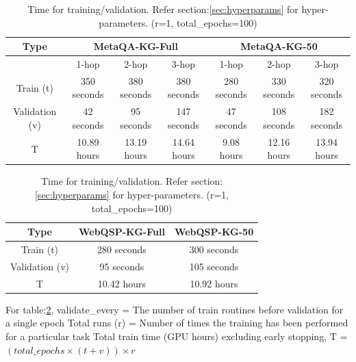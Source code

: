 \begin{table}[]
\centering
\begin{tabular}{c|c|c|c|c|c|c}
\hline
\textbf{Type}  & \multicolumn{3}{c|}{\textbf{MetaQA-KG-Full}} & \multicolumn{3}{c}{\textbf{MetaQA-KG-50}} \\ \hline
               & 1-hop         & 2-hop         & 3-hop        & 1-hop        & 2-hop        & 3-hop        \\ \hline
Train (t)      & 350 seconds   & 380 seconds   & 380 seconds  & 280 seconds  & 330 seconds  & 320 seconds  \\ \hline
Validation (v) & 42 seconds    & 95 seconds    & 147 seconds  & 47 seconds   & 108 seconds  & 182 seconds  \\ \hline
T              & 10.89 hours   & 13.19 hours   & 14.64 hours  & 9.08 hours   & 12.16 hours  & 13.94 hours  \\ \hline
\end{tabular}
\vspace{.1in}
\label{metaqa-data-train-time}

\begin{tabular}{c|c|l|l|c|l|l}
\hline
\textbf{Type} & \multicolumn{3}{c|}{\textbf{WebQSP-KG-Full}} & \multicolumn{3}{c}{\textbf{WebQSP-KG-50}} \\ \hline
Train  (t)     & \multicolumn{3}{c|}{280 seconds}              & \multicolumn{3}{c}{300 seconds}            \\ \hline
Validation  (v)  & \multicolumn{3}{c|}{95 seconds}              & \multicolumn{3}{c}{105 seconds}           \\ \hline
T             & \multicolumn{3}{c|}{10.42 hours}             & \multicolumn{3}{c}{10.92 hours}           \\ \hline
\end{tabular}
\caption{Time for training/validation. Refer section:\ref{sec:hyperparams} for hyper-parameters. (r=1, total\_epochs=100)}
\label{webqsp-data-train-time}

For table:\ref{webqsp-data-train-time},  validate\_every = The number of train routines before validation for a single epoch \newline
Total runs (r) = Number of times the training has been performed for a particular task \newline Total train time (GPU hours) excluding early stopping, T = $(total\_epochs \times (t + v)) \times r$\newline

\end{table}
